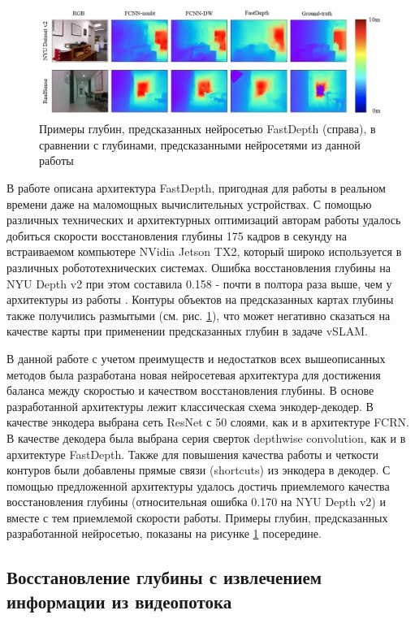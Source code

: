 \documentclass{mipt-thesis-ms}
\begin{document}
	\begin{figure}
		\includegraphics[width=1.0\textwidth]{img/depths.eps}
		\caption{Примеры глубин, предсказанных нейросетью FastDepth (справа), в сравнении с глубинами, предсказанными нейросетями из данной работы}
		\label{figure_fastdepth_preidctions}
	\end{figure}
	
	В работе \cite{wofk2019fastdepth} описана архитектура FastDepth, пригодная для работы в реальном времени даже на маломощных вычислительных устройствах. С помощью различных технических и архитектурных оптимизаций авторам работы удалось добиться скорости восстановления глубины 175 кадров в секунду на встраиваемом компьютере NVidia Jetson TX2, который широко используется в различных робототехнических системах. Ошибка восстановления глубины на NYU Depth v2 при этом составила 0.158 - почти в полтора раза выше, чем у архитектуры из работы \cite{huynh2020guiding}. Контуры объектов на предсказанных картах глубины также получились размытыми (см. рис. \ref{figure_fastdepth_preidctions}), что может негативно сказаться на качестве карты при применении предсказанных глубин в задаче vSLAM.
	
	В данной работе с учетом преимуществ и недостатков всех вышеописанных методов была разработана новая нейросетевая архитектура для достижения баланса между скоростью и качеством восстановления глубины. В основе разработанной архитектуры лежит классическая схема энкодер-декодер. В качестве энкодера выбрана сеть ResNet с 50 слоями, как и в архитектуре FCRN. В качестве декодера была выбрана серия сверток depthwise convolution, как и в архитектуре FastDepth. Также для повышения качества работы и четкости контуров были добавлены прямые связи (shortcuts) из энкодера в декодер. С помощью предложенной архитектуры удалось достичь приемлемого качества восстановления глубины (относительная ошибка 0.170 на NYU Depth v2) и вместе с тем приемлемой скорости работы. Примеры глубин, предсказанных разработанной нейросетью, показаны на рисунке \ref{figure_fastdepth_preidctions} посередине.
	
	\subsection{Восстановление глубины с извлечением информации из видеопотока}
	
\end{document}
